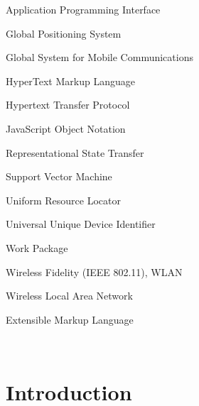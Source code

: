 \documentclass[external]{20120615_deliverable_template_ukob}
\theoremstyle{definition}
\begin{document}
\begin{LGAbbreviations}

{Application Programming Interface}

{Global Positioning System}

{Global System for Mobile Communications}

{HyperText Markup Language}

{Hypertext Transfer Protocol}

{JavaScript Object Notation}

{Representational State Transfer}

{Support Vector Machine}

{Uniform Resource Locator}

{Universal Unique Device Identifier}

{Work Package}

{Wireless Fidelity (IEEE 802.11), WLAN}

{Wireless Local Area Network}

{Extensible Markup Language}

\LGaddabbreviation{~\\}
{~~~}

\end{LGAbbreviations}


\setcounter{tocdepth}{1}

\LGTOC

\newpage

\chapter{Introduction}
\label{chap:Introduction}
\clearpage
\end{document}
